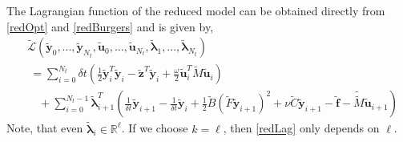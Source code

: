 The Lagrangian function of the reduced model can be obtained directly from \eqref{redOpt} and \eqref{redBurgers} and is given by,
\begin{align}
\label{redLag}
&\mathcal{\tilde L}(\mathbf{\tilde y}_0,...,\mathbf{\tilde y}_{N_t}, \mathbf{\tilde u}_0,...,\mathbf{\tilde u}_{N_t},\boldsymbol{\tilde \lambda}_1,...,\boldsymbol{\tilde \lambda}_{N_t}) \nonumber \\
&\ = \sum_{i=0}^{N_t} \delta \! t \left( \frac{1}{2} \mathbf{\tilde y}_i^T \mathbf{\tilde y}_i - \mathbf{\tilde z}^T\mathbf{\tilde y}_i + \frac{\omega}{2} \mathbf{\tilde u}_i^T \tilde{M} \mathbf{\tilde u}_i \right) \nonumber \\
&\quad +  \sum_{i=0}^{N_t-1} \boldsymbol{\tilde \lambda}_{i+1}^T \left( \frac{1}{\delta \! t} \mathbf{\tilde y}_{i+1} - \frac{1}{\delta \! t} \mathbf{\tilde y}_i + \frac{1}{2} \tilde{B} (\tilde{F} \mathbf{\tilde y}_{i+1})^2 + \nu \tilde{C} \mathbf{\tilde y}_{i+1} - \mathbf{\tilde f} - \tilde{\tilde{M}} \mathbf{\tilde u}_{i+1}  \right)
\end{align}
Note, that even $\boldsymbol{\tilde \lambda}_i \in \mathbb{R}^\ell$. If we choose $k = \ell$, then \eqref{redLag} only depends on $\ell$.


